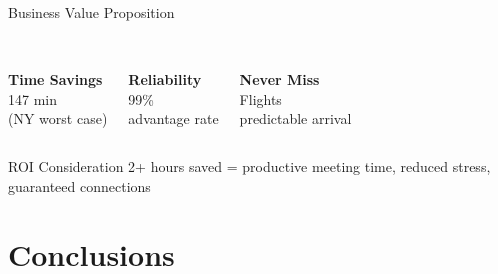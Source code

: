 \documentclass[aspectratio=169,9pt]{beamer}
\begin{document}
\begin{frame}{Business Value Proposition}
\begin{columns}
\begin{center}
\textcolor{revoBlue}{\Large{\faClock}}\\[0.3em]
\small{\textbf{Time Savings}}\\[0.3em]
\large{147 min}\\
\footnotesize{(NY worst case)}
\end{center}

\begin{center}
\textcolor{revoGreen}{\Large{\faCheckCircle}}\\[0.3em]
\small{\textbf{Reliability}}\\[0.3em]
\large{99\%}\\
\footnotesize{advantage rate}
\end{center}

\begin{center}
\textcolor{revoOrange}{\Large{\faPlane}}\\[0.3em]
\small{\textbf{Never Miss}}\\[0.3em]
\large{Flights}\\
\footnotesize{predictable arrival}
\end{center}
\end{columns}

\vspace{0.8em}
\begin{exampleblock}{ROI Consideration}
\small{2+ hours saved = productive meeting time, reduced stress, guaranteed connections}
\end{exampleblock}
\end{frame}

\section{Conclusions}
\end{document}
